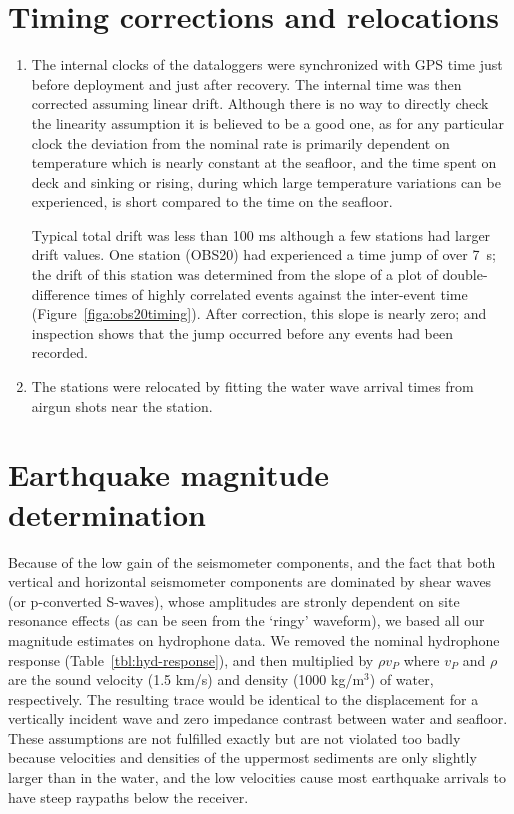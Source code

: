\documentclass[reviewcopy]{elsarticle}
\begin{document}
\section{Timing corrections and relocations}

\begin{enumerate}
\item
The internal clocks of the dataloggers were synchronized with GPS time
just before deployment and just after recovery. The internal time was
then corrected assuming linear drift.  Although there is no way to
directly check the linearity assumption it is believed to be a good
one, as for any particular clock the deviation from the nominal rate
is primarily dependent on temperature which is nearly constant at the
seafloor, and the time spent on deck and sinking or rising, during
which large temperature variations can be experienced, is short
compared to the time on the seafloor.

 Typical total drift was less than
100 ms although a few stations had larger drift values.  One station
(OBS20) had experienced a time jump of over 7~s;
the drift of this
station was determined from the slope of a plot of double-difference
times of highly correlated events against the inter-event time
(Figure~\ref{figa:obs20timing}).  After correction, this slope is
nearly zero; and inspection shows that the jump occurred before any
events had been recorded.

\item The stations were relocated by fitting the water wave arrival
times from airgun shots near the station. 
\end{enumerate}


\section{Earthquake magnitude determination}
\label{sec:magnitude}

Because of the low gain of the seismometer components, and the fact
that both vertical and horizontal seismometer components are dominated
by shear waves (or p-converted S-waves), whose amplitudes are stronly
dependent on site resonance effects (as can be seen from the `ringy'
waveform), we based all our magnitude estimates on hydrophone data.
We removed the nominal hydrophone response
(Table~\ref{tbl:hyd-response}), and then multiplied by
$\rho v_P$ where $v_P$ and $\rho$ are the sound velocity (1.5 km/s)
and density (1000 kg/m$^3$)
of water, respectively. The resulting trace would be identical to the
displacement for a vertically incident wave and zero impedance contrast
between water and seafloor.  These assumptions are not fulfilled
exactly but are not violated too badly because velocities and
densities of the uppermost sediments are only slightly larger than in
the water, and the low velocities cause most earthquake arrivals to
have steep raypaths below the receiver.
\end{document}
